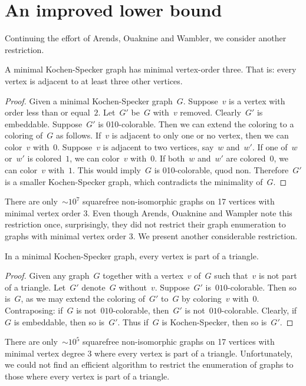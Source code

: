 \documentclass{report}
\begin{document}
\section{An improved lower bound}
\label{sec:ilb}
Continuing the effort of Arends, Ouaknine and Wambler,
we consider another restriction.
\begin{proposition}
    A minimal Kochen-Specker graph has minimal vertex-order three.
    That is: every vertex is adjacent to at least three other vertices.
\end{proposition}
\begin{proof}
    Given a minimal Kochen-Specker graph~$G$.
    Suppose~$v$ is a vertex with order less than or equal~$2$.
    Let~$G'$ be~$G$ with~$v$ removed.
    Clearly~$G'$ is embeddable.
    Suppose~$G'$ is 010-colorable.
    Then we can extend the coloring to a coloring of~$G$ as follows.
    If~$v$ is adjacent to only one or no vertex,
    then we can color~$v$ with~$0$.
    Suppose~$v$ is adjacent to two vertices, say~$w$ and~$w'$.
    If one of~$w$ or~$w'$ is colored~$1$, we can color~$v$ with~$0$.
    If both~$w$ and~$w'$ are colored~$0$, we can color~$v$ with~$1$.
    This would imply~$G$ is 010-colorable, quod non.
    Therefore~$G'$ is a smaller
    Kochen-Specker graph, which contradicts the minimality of~$G$.
\end{proof}
There are only~${\sim}10^7$
squarefree non-isomorphic graphs on 17 vertices with minimal vertex order 3.
Even though Arends, Ouaknine and Wampler
note this restriction once,
surprisingly, they did not restrict their graph enumeration
to graphs with minimal vertex order 3.
We present another considerable restriction.

\begin{proposition}\label{prop:ks-enoughtriangles}
    In a minimal Kochen-Specker graph,
        every vertex is part of a triangle.
\end{proposition}
\begin{proof}
    Given any graph~$G$ together with a vertex~$v$ of~$G$
        such that~$v$ is not part of a triangle.
    Let~$G'$ denote~$G$ without~$v$.
    Suppose~$G'$ is~$010$-colorable.
    Then so is~$G$, as we may extend the coloring of~$G'$
        to~$G$ by coloring~$v$ with~$0$.
    Contraposing: if~$G$ is not~$010$-colorable,
        then~$G'$ is not~$010$-colorable.
    Clearly, if~$G$ is embeddable, then so is~$G'$.
    Thus if~$G$ is Kochen-Specker, then so is~$G'$.
\end{proof}
There are only~${\sim}10^5$ squarefree non-isomorphic 
graphs on 17 vertices with minimal vertex degree 3
where every vertex is part of a triangle.
Unfortunately,
we could not find an efficient algorithm
to restrict the enumeration of graphs
to those where every vertex is part of a triangle.
\end{document}
